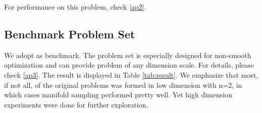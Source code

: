 \documentclass[10pt, oneside]{article}
\begin{document}
For performance on this problem, check \ref{ap2}.


\subsection{Benchmark Problem Set}
We adopt \cite{benchmark} as benchmark. The problem set is especially designed for non-smooth optimization and can provide problem of any dimension scale. For details, please check \ref{ap3}. The result is displayed in Table \ref{tab:result}. We emphasize that most, if not all, of the original problems was formed in low dimension with n=2, in which cases manifold sampling performed pretty well. Yet high dimension experiments were done for further exploration. 

\end{document}
